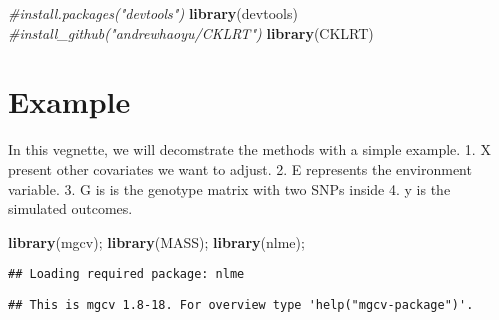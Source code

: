 \documentclass[11pt,]{article}
\newenvironment{Shaded}{\begin{snugshade}}{\end{snugshade}}
\newcommand{\KeywordTok}[1]{\textcolor[rgb]{0.13,0.29,0.53}{\textbf{#1}}}
\newcommand{\CommentTok}[1]{\textcolor[rgb]{0.56,0.35,0.01}{\textit{#1}}}
\newcommand{\NormalTok}[1]{#1}
\begin{document}
\begin{Shaded}
\begin{Highlighting}[]
\CommentTok{#install.packages("devtools")  }
\KeywordTok{library}\NormalTok{(devtools)  }
\CommentTok{#install_github("andrewhaoyu/CKLRT")}
\KeywordTok{library}\NormalTok{(CKLRT)}
\end{Highlighting}
\end{Shaded}

\section{Example}\label{example}

In this vegnette, we will decomstrate the methods with a simple example.
1. X present other covariates we want to adjust. 2. E represents the
environment variable. 3. G is is the genotype matrix with two SNPs
inside 4. y is the simulated outcomes.

\begin{Shaded}
\begin{Highlighting}[]
\KeywordTok{library}\NormalTok{(mgcv); }\KeywordTok{library}\NormalTok{(MASS); }\KeywordTok{library}\NormalTok{(nlme);}
\end{Highlighting}
\end{Shaded}

\begin{verbatim}
## Loading required package: nlme
\end{verbatim}

\begin{verbatim}
## This is mgcv 1.8-18. For overview type 'help("mgcv-package")'.
\end{verbatim}
\end{document}
